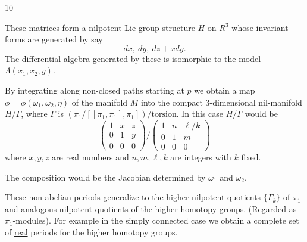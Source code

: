\hfill 10

These matrices form a nilpotent Lie group structure $H$
on $R^3$ whose invariant forms are generated by say
\[
dx,\ dy,\ dz+xdy.
\]
The differential algebra generated by these is isomorphic
to the model $\Lambda(x_1,x_2,y)$.

By integrating along non-closed paths starting at
$p$ we obtain a map $\phi=\phi(\omega_1,\omega_2,\eta)$ of the manifold $M$
into the compact 3-dimensional nil-manifold $H/\Gamma$,
where $\Gamma$ is $(\pi_1/[[\pi_1,\pi_1],\pi_1])/\text{torsion}$. In this case
$H/\Gamma$ would be
\[
\begin{pmatrix}1&x&z\\0&1&y\\0&0&0\end{pmatrix}
\Big/\begin{pmatrix}1&n&\ell/k\\0&1&m\\0&0&0\end{pmatrix}
\]
where $x,y,z$ are real numbers and $n,m,\ell,k$ are integers
with $k$ fixed.

The composition
would be the Jacobian determined by $\omega_1$ and $\omega_2$.

These non-abelian periods generalize to the higher
nilpotent quotients $\{\Gamma_k\}$ of $\pi_1$ and analogous nilpotent
quotients of the higher homotopy groups. (Regarded as
$\pi_1$-modules). For example in the simply connected case
we obtain a complete set of \uline{real} periods for the higher
homotopy groups.

